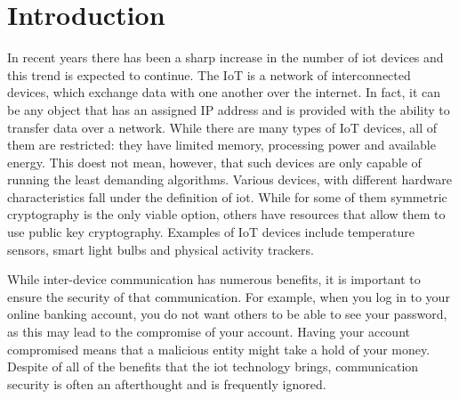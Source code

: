 
\section{Introduction}
\label{sec:intro}

In recent years there has been a sharp increase in the number of \gls{iot}
devices and this trend is expected to continue\cite{IoTnumb83:online}. The IoT is a network
of interconnected devices, which exchange data with one another over
the internet. In fact, it can be any object that has an assigned
IP address and is provided with the ability to transfer data over a network. 
While there are many types of IoT devices, all of them
are restricted: they have limited memory, processing power and
available energy. This doest not mean, however, that such devices are only
capable of running the least demanding algorithms. Various devices, with different
hardware characteristics fall under the definition of \gls{iot}.
While for some of them symmetric cryptography is the only viable option,
others have resources that allow them to use public key cryptography.
Examples of IoT devices include temperature sensors,
smart light bulbs and physical activity trackers.

While inter-device communication has numerous benefits, it is important
to ensure the security of that communication. For example, when you log
in to your online banking account, you do not want others to be
able to see your password, as this may lead to the compromise of your
account. Having your account compromised means that a malicious entity
might take a hold of your money. Despite of all of the benefits that the \gls{iot} 
technology brings, communication security is often an afterthought and is 
frequently ignored.

